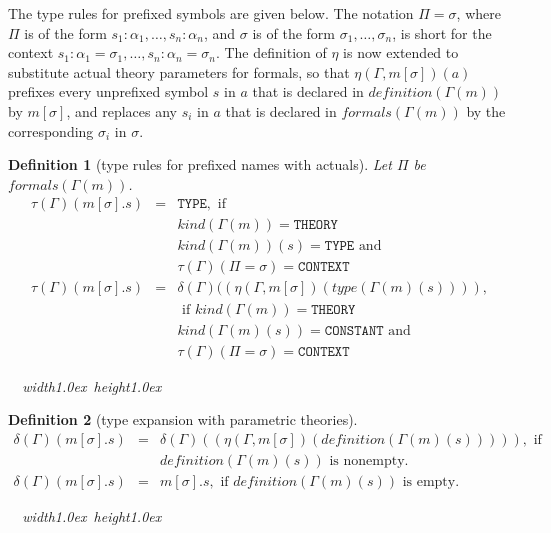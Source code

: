 \documentclass [12pt,twoside]{cslreport}
\newcommand{\thmbox}
   {{\ \hfill\hbox{%
      \vrule width1.0ex height1.0ex
   }\parfillskip 0pt }}
\newcommand{\tauGamma}[1]{\tau(\Gamma)(#1)}
\newcommand{\tttype}{\mathtt{TYPE}}
\newcommand{\ttcontext}{\mathtt{CONTEXT}}
\newcommand{\ttconstant}{\mathtt{CONSTANT}}
\newcommand{\tttheory}{\mathtt{THEORY}}
\newcommand{\itkind}{\textit{kind}}
\newcommand{\ittype}{\textit{type}}
\newcommand{\itdef}{\textit{definition}}
\newcommand{\itformals}{\textit{formals}}
\newtheorem{definition}{Definition}
\newenvironment{Defn}[1]{\begin{definition}[#1]\label{defn:#1}}{
\thmbox\end{definition}}
\begin{document}
  The 
 type  rules for prefixed symbols are given below.
The notation $\Pi = \sigma$, where $\Pi$ is of the form
$s_1 : \alpha_1,\ldots, s_n : \alpha_n$, and $\sigma$ is of
the form $\sigma_1,\ldots, \sigma_n$, is short for
the context $s_1 : \alpha_1 = \sigma_1, \ldots, s_n : \alpha_n =
\sigma_n$\@.  The definition of $\eta$ is now extended to substitute
actual theory parameters for formals, so that $\eta(\Gamma, m[\sigma])(a)$
prefixes every unprefixed symbol $s$ in $a$ that is declared in
$\itdef(\Gamma(m))$ by $m[\sigma]$, and replaces any $s_i$ in $a$
that is declared in $\itformals(\Gamma(m))$ by the corresponding
$\sigma_i$ in $\sigma$\@.  

\begin{Defn}{type rules for prefixed names with actuals}
Let $\Pi$ be $\mathit{formals}(\Gamma(m))$\@.  
\begin{eqnarray*}
  \tauGamma{m[\sigma].s} & = & \tttype{}, \mbox{ if }\\& & 
\itkind{}(\Gamma(m)) =  \tttheory{} \\ & &
\itkind{}(\Gamma(m))(s) = \tttype{} \mbox{ and }\\& &
\tauGamma{\Pi = \sigma} = \ttcontext\\
%
  \tauGamma{m[\sigma].s} & = & \delta(\Gamma)((\eta(\Gamma, m[\sigma])(
\ittype(\Gamma(m)(s)) )), \\ & &
\mbox{ if } \itkind{}(\Gamma(m)) = \tttheory{} \\ & &
\itkind{}(\Gamma(m)(s)) = \ttconstant{} \mbox{ and }\\& &
\tauGamma{\Pi = \sigma} = \ttcontext
\end{eqnarray*}
\end{Defn}

\begin{comment}
The definition of $\delta$ has to be modified slightly to carry along the
parameters.  The notation $a[\Pi]$ represents the result of
replacing each occurrence of a symbol $s$ in $a$ such that $\Pi(s)$ is
defined, by $\itdef{}(\Pi(s))$ when it exists.
\end{comment}
\begin{Defn}{type expansion with parametric theories}
\begin{eqnarray*}
  \delta(\Gamma)(m[\sigma].s) & = & \delta(\Gamma)(
(\eta(\Gamma, m[\sigma])(\itdef{}(\Gamma(m)(s)))) ), 
                        \mbox{ if }\\ & &  \itdef{}(\Gamma(m)(s)) \mbox{ is
nonempty.}\\
  \delta(\Gamma)(m[\sigma].s) & = & m[\sigma].s, 
                        \mbox{ if } \itdef{}(\Gamma(m)(s)) \mbox{ is
empty.}
\end{eqnarray*}
\end{Defn}
\end{document}
